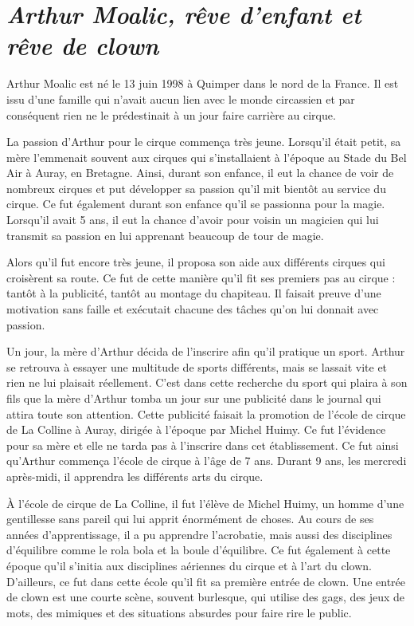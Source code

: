 \section*{\textit{Arthur Moalic, rêve d’enfant et rêve de clown}}
{}
\noindent
Arthur Moalic est né le 13 juin 1998 à Quimper dans le nord de la France. Il est issu d’une famille qui n’avait aucun lien avec le monde circassien et par conséquent rien ne le prédestinait à un jour faire carrière au cirque.

La passion d’Arthur pour le cirque commença très jeune. Lorsqu’il était petit, sa mère l’emmenait souvent aux cirques qui s’installaient à l’époque au Stade du Bel Air à Auray, en Bretagne. Ainsi, durant son enfance, il eut la chance de voir de nombreux cirques et put développer sa passion qu’il mit bientôt au service du cirque. Ce fut également durant son enfance qu’il se passionna pour la magie. Lorsqu’il avait 5 ans, il eut la chance d’avoir pour voisin un magicien qui lui transmit sa passion en lui apprenant beaucoup de tour de magie.

Alors qu’il fut encore très jeune, il proposa son aide aux différents cirques qui croisèrent sa route. Ce fut de cette manière qu’il fit ses premiers pas au cirque : tantôt à la publicité, tantôt au montage du chapiteau. Il faisait preuve d’une motivation sans faille et exécutait chacune des tâches qu’on lui donnait avec passion. 

Un jour, la mère d'Arthur décida de l’inscrire afin qu’il pratique un sport. Arthur se retrouva à essayer une multitude de sports différents, mais se lassait vite et rien ne lui plaisait réellement. C’est dans cette recherche du sport qui plaira à son fils que la mère d’Arthur tomba un jour sur une publicité dans le journal qui attira toute son attention. Cette publicité faisait la promotion de l’école de cirque de La Colline à Auray, dirigée à l’époque par Michel Huimy. Ce fut l’évidence pour sa mère et elle ne tarda pas à l'inscrire dans cet établissement. Ce fut ainsi qu’Arthur commença l’école de cirque à l’âge de 7 ans. Durant 9 ans, les mercredi après-midi, il apprendra les différents arts du cirque. 

À l’école de cirque de La Colline, il fut l’élève de Michel Huimy, un homme d’une gentillesse sans pareil qui lui apprit énormément de choses. Au cours de ses années d’apprentissage, il a pu apprendre l’acrobatie, mais aussi des disciplines d’équilibre comme le rola bola et la boule d’équilibre. Ce fut également à cette époque qu’il s’initia aux disciplines aériennes du cirque et à l’art du clown. D’ailleurs, ce fut dans cette école qu’il fit sa première entrée de clown. Une entrée de clown est une courte scène, souvent burlesque, qui utilise des gags, des jeux de mots, des mimiques et des situations absurdes pour faire rire le public. 

